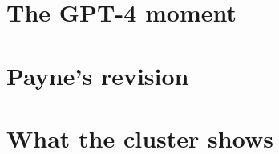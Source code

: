 \section{The GPT-4 moment}

%
%
%

\section{Payne's revision}

%

\section{What the cluster shows}

%
%
